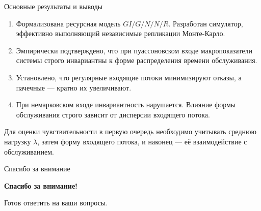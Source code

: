 \documentclass[aspectratio=169,12pt]{beamer}
\begin{document}
\begin{frame}{Основные результаты и выводы}

\begin{enumerate}
  \item Формализована ресурсная модель $GI/G/N/N/R$. Разработан симулятор, эффективно выполняющий независимые репликации Монте-Карло.
  \item Эмпирически подтверждено, что при пуассоновском входе макропоказатели системы строго инвариантны к форме распределения времени обслуживания.
  \item Установлено, что регулярные входящие потоки минимизируют отказы, а пачечные — кратно их увеличивают.
  \item При немарковском входе инвариантность нарушается. Влияние формы обслуживания строго зависит от дисперсии входящего потока.
\end{enumerate}

\vspace{0.1cm}
Для оценки чувствительности в первую очередь необходимо учитывать среднюю нагрузку $\lambda$, затем форму входящего потока, и наконец — её взаимодействие с обслуживанием.

\end{frame}

\begin{frame}{Спасибо за внимание}

\vspace{1.7cm}

\begin{center}
{\Huge\color{rudnblue}\bfseries Спасибо за внимание!}

\vspace{0.9cm}

{\Large Готов ответить на ваши вопросы.}
\end{center}

\end{frame}
\end{document}
